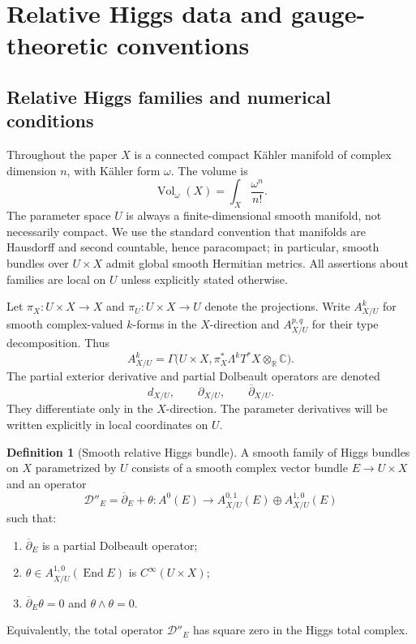 \documentclass[11pt,reqno]{amsart}
\theoremstyle{definition}
\newtheorem{definition}[theorem]{Definition}
\theoremstyle{remark}
\newcommand{\C}{\mathbb C}
\newcommand{\R}{\mathbb R}
\newcommand{\cD}{\mathcal D}
\newcommand{\End}{\operatorname{End}}
\newcommand{\Vol}{\operatorname{Vol}}
\newcommand{\ddbar}{\overline\partial}
\begin{document}
\section{Relative Higgs data and gauge-theoretic conventions}\label{sec:relative-data}

\subsection{Relative Higgs families and numerical conditions}

Throughout the paper $X$ is a connected compact K\"ahler manifold of complex dimension $n$, with K\"ahler form $\omega$.  The volume is
\[
  \Vol_\omega(X)=\int_X\frac{\omega^n}{n!}.
\]
The parameter space $U$ is always a finite-dimensional smooth manifold, not necessarily compact.  We use the standard convention that manifolds are Hausdorff and second countable, hence paracompact; in particular, smooth bundles over $U\times X$ admit global smooth Hermitian metrics.  All assertions about families are local on $U$ unless explicitly stated otherwise.

Let $\pi_X:U\times X\to X$ and $\pi_U:U\times X\to U$ denote the projections.  Write $A^k_{X/U}$ for smooth complex-valued $k$-forms in the $X$-direction and $A^{p,q}_{X/U}$ for their type decomposition.  Thus
\[
  A^k_{X/U}=\Gamma\bigl(U\times X,\pi_X^*\Lambda^kT^*X\otimes_\R\C\bigr).
\]
The partial exterior derivative and partial Dolbeault operators are denoted
\[
  d_{X/U},\qquad \partial_{X/U},\qquad\ddbar_{X/U}.
\]
They differentiate only in the $X$-direction.  The parameter derivatives will be written explicitly in local coordinates on $U$.

\begin{definition}[Smooth relative Higgs bundle]\label{def:relative-higgs}
A smooth family of Higgs bundles on $X$ parametrized by $U$ consists of a smooth complex vector bundle $E\to U\times X$ and an operator
\[
  \cD''_E=\ddbar_E+\theta:
  A^0(E)\longrightarrow
  A^{0,1}_{X/U}(E)\oplus A^{1,0}_{X/U}(E)
\]
such that:
\begin{enumerate}[label=(\roman*)]
\item $\ddbar_E$ is a partial Dolbeault operator;
\item $\theta\in A^{1,0}_{X/U}(\End E)$ is $C^\infty(U\times X)$;
\item $\ddbar_E\theta=0$ and $\theta\wedge\theta=0$.
\end{enumerate}
Equivalently, the total operator $\cD''_E$ has square zero in the Higgs total complex.
\end{definition}
\end{document}
